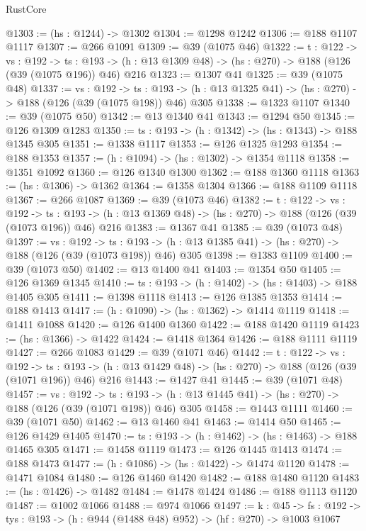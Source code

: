 \begin{lexlean}{RustCore}
\begin{coremodule}
@1303 := (hs : @1244) -> @1302
@1304 := @1298 @1242
@1306 := @188 @1107 @1117
@1307 := @266 @1091
@1309 := @39 (@1075 @46)
@1322 := {t : @122} ->
  {vs : @192} ->
  {ts : @193} -> (h : @13 @1309 @48) -> (hs : @270) -> @188 (@126 (@39 (@1075 @196)) @46) @216
@1323 := @1307 @41
@1325 := @39 (@1075 @48)
@1337 := {vs : @192} ->
  {ts : @193} -> (h : @13 @1325 @41) -> (hs : @270) -> @188 (@126 (@39 (@1075 @198)) @46) @305
@1338 := @1323 @1107
@1340 := @39 (@1075 @50)
@1342 := @13 @1340 @41
@1343 := @1294 @50
@1345 := @126 @1309 @1283
@1350 := {ts : @193} -> (h : @1342) -> (hs : @1343) -> @188 @1345 @305
@1351 := @1338 @1117
@1353 := @126 @1325 @1293
@1354 := @188 @1353
@1357 := (h : @1094) -> (hs : @1302) -> @1354 @1118
@1358 := @1351 @1092
@1360 := @126 @1340 @1300
@1362 := @188 @1360 @1118
@1363 := (hs : @1306) -> @1362
@1364 := @1358 @1304
@1366 := @188 @1109 @1118
@1367 := @266 @1087
@1369 := @39 (@1073 @46)
@1382 := {t : @122} ->
  {vs : @192} ->
  {ts : @193} -> (h : @13 @1369 @48) -> (hs : @270) -> @188 (@126 (@39 (@1073 @196)) @46) @216
@1383 := @1367 @41
@1385 := @39 (@1073 @48)
@1397 := {vs : @192} ->
  {ts : @193} -> (h : @13 @1385 @41) -> (hs : @270) -> @188 (@126 (@39 (@1073 @198)) @46) @305
@1398 := @1383 @1109
@1400 := @39 (@1073 @50)
@1402 := @13 @1400 @41
@1403 := @1354 @50
@1405 := @126 @1369 @1345
@1410 := {ts : @193} -> (h : @1402) -> (hs : @1403) -> @188 @1405 @305
@1411 := @1398 @1118
@1413 := @126 @1385 @1353
@1414 := @188 @1413
@1417 := (h : @1090) -> (hs : @1362) -> @1414 @1119
@1418 := @1411 @1088
@1420 := @126 @1400 @1360
@1422 := @188 @1420 @1119
@1423 := (hs : @1366) -> @1422
@1424 := @1418 @1364
@1426 := @188 @1111 @1119
@1427 := @266 @1083
@1429 := @39 (@1071 @46)
@1442 := {t : @122} ->
  {vs : @192} ->
  {ts : @193} -> (h : @13 @1429 @48) -> (hs : @270) -> @188 (@126 (@39 (@1071 @196)) @46) @216
@1443 := @1427 @41
@1445 := @39 (@1071 @48)
@1457 := {vs : @192} ->
  {ts : @193} -> (h : @13 @1445 @41) -> (hs : @270) -> @188 (@126 (@39 (@1071 @198)) @46) @305
@1458 := @1443 @1111
@1460 := @39 (@1071 @50)
@1462 := @13 @1460 @41
@1463 := @1414 @50
@1465 := @126 @1429 @1405
@1470 := {ts : @193} -> (h : @1462) -> (hs : @1463) -> @188 @1465 @305
@1471 := @1458 @1119
@1473 := @126 @1445 @1413
@1474 := @188 @1473
@1477 := (h : @1086) -> (hs : @1422) -> @1474 @1120
@1478 := @1471 @1084
@1480 := @126 @1460 @1420
@1482 := @188 @1480 @1120
@1483 := (hs : @1426) -> @1482
@1484 := @1478 @1424
@1486 := @188 @1113 @1120
@1487 := @1002 @1066
@1488 := @974 @1066
@1497 := {k : @45} ->
  {fs : @192} -> {tys : @193} -> (h : @944 (@1488 @48) @952) -> (hf : @270) -> @1003 @1067

\end{coremodule}
\end{lexlean}
